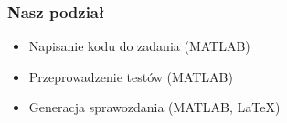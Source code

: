 
\begin{frame}
    \frametitle{Nasz podział}
    \begin{itemize}[<+->]
        \item Napisanie kodu do zadania (MATLAB)
        \item Przeprowadzenie testów (MATLAB)
        \item Generacja sprawozdania (MATLAB, LaTeX)
    \end{itemize} 
\end{frame}
